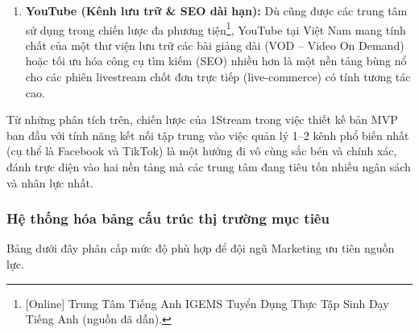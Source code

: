 \begin{enumerate}
    \item \textbf{YouTube (Kênh lưu trữ \& SEO dài hạn):} Dù cũng được các trung tâm sử dụng trong chiến lược đa phương tiện\footnote{[Online] Trung Tâm Tiếng Anh IGEMS Tuyển Dụng Thực Tập Sinh Dạy Tiếng Anh (nguồn đã dẫn).}, YouTube tại Việt Nam mang tính chất của một thư viện lưu trữ các bài giảng dài (VOD -- Video On Demand) hoặc tối ưu hóa công cụ tìm kiếm (SEO) nhiều hơn là một nền tảng bùng nổ cho các phiên livestream chốt đơn trực tiếp (live-commerce) có tính tương tác cao.
\end{enumerate}

Từ những phân tích trên, chiến lược của 1Stream trong việc thiết kế bản MVP ban đầu với tính năng kết nối tập trung vào việc quản lý 1--2 kênh phổ biến nhất (cụ thể là Facebook và TikTok) là một hướng đi vô cùng sắc bén và chính xác, đánh trực diện vào hai nền tảng mà các trung tâm đang tiêu tốn nhiều ngân sách và nhân lực nhất.


\subsubsection{Hệ thống hóa bảng cấu trúc thị trường mục tiêu}

Bảng dưới đây phân cấp mức độ phù hợp để đội ngũ Marketing ưu tiên nguồn lực.

